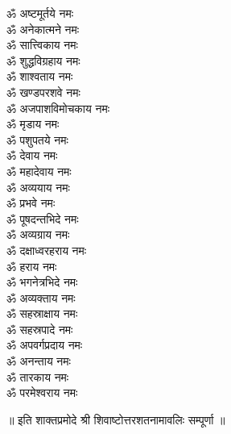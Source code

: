 \begin{multicols}{2}
\begin{flushleft}
ॐ अष्टमूर्तये नमः\\
ॐ अनेकात्मने नमः\\
ॐ सात्त्विकाय नमः\\
ॐ शुद्धविग्रहाय नमः\\
ॐ शाश्वताय नमः\\
ॐ खण्डपरशवे नमः\\
ॐ अजपाशविमोचकाय नमः\hfill{}\\
ॐ मृडाय नमः\\
ॐ पशुपतये नमः\\
ॐ देवाय नमः\\
ॐ महादेवाय नमः\\
ॐ अव्ययाय नमः\\
ॐ प्रभवे नमः\\
ॐ पूषदन्तभिदे नमः\\
ॐ अव्यग्राय नमः\\
ॐ दक्षाध्वरहराय नमः\\
ॐ हराय नमः\hfill{}\\
ॐ भगनेत्रभिदे नमः\\
ॐ अव्यक्ताय नमः\\
ॐ सहस्राक्षाय नमः\\
ॐ सहस्रपादे नमः\\
ॐ अपवर्गप्रदाय नमः\\
ॐ अनन्ताय नमः\\
ॐ तारकाय नमः\\
ॐ परमेश्वराय नमः\\
\end{flushleft}
\end{multicols}
\centerline{॥ इति शाक्तप्रमोदे श्री शिवाष्टोत्तरशतनामावलिः सम्पूर्णा ॥}
